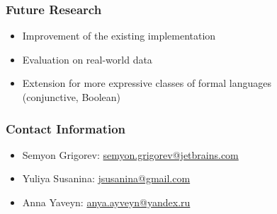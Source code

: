 \documentclass[xcolor=table]{beamer}
\begin{document}
\begin{frame}[fragile] \frametitle{Future Research}
    \begin{itemize}
        \item Improvement of the existing implementation 
        \item Evaluation on real-world data
        \item Extension for more expressive classes of formal languages \\ (conjunctive,  Boolean)
    \end{itemize}
\end{frame}


\begin{frame}
\frametitle{Contact Information}
\begin{itemize}
  \item Semyon Grigorev: \href{mailto:semyon.grigorev@jetbrains.com}{semyon.grigorev@jetbrains.com}
  \item Yuliya Susanina: \href{mailto:jsusanina@gmail.com}{jsusanina@gmail.com}
  \item Anna Yaveyn: \href{mailto:anya.ayveyn@yandex.ru}{anya.ayveyn@yandex.ru}
\end{itemize}
\vspace{0.1cm}
\end{frame}
\end{document}
